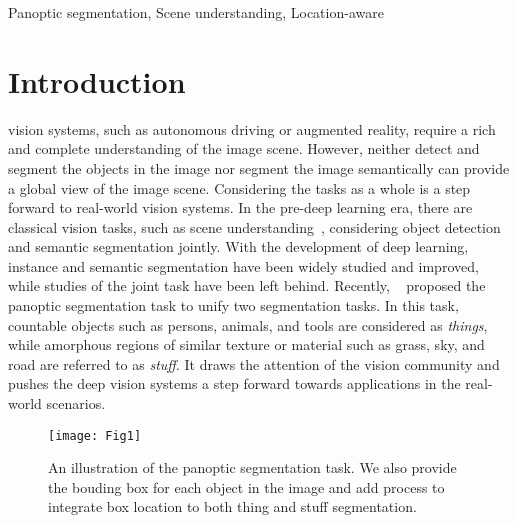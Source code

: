 \documentclass[journal,final]{IEEEtran}
\begin{document}
\begin{IEEEkeywords}
Panoptic segmentation, Scene understanding, Location-aware
\end{IEEEkeywords}






\IEEEpeerreviewmaketitle





\section{Introduction} \label{intro}

 vision systems, such as autonomous driving or augmented reality, require a rich and complete understanding of the image scene. However, neither detect and segment the objects in the image nor segment the image semantically can provide a global view of the image scene. Considering the tasks as a whole is a step forward to real-world vision systems. In the pre-deep learning era, there are classical vision tasks, such as scene understanding~\cite{detectorcrfs,wholescene}, considering object detection and semantic segmentation jointly. With the development of deep learning, instance and semantic segmentation have been widely studied and improved, while studies of the joint task have been left behind. Recently, ~\cite{panopticsegmentation} proposed the panoptic segmentation task to unify two segmentation tasks. In this task, countable objects such as persons, animals, and tools are considered as {\em things}, while amorphous regions of similar texture or material such as grass, sky, and road are referred to as {\em stuff}. It draws the attention of the vision community and pushes the deep vision systems a step forward towards applications in the real-world scenarios.  
\begin{figure}
  \centering
  \texttt{[image: Fig1]}
  \caption{An illustration of the panoptic segmentation task. We also provide the bouding box for each object in the image and add process to integrate box location to both thing and stuff segmentation.}
   \label{fig0}
\end{figure}
\end{document}
